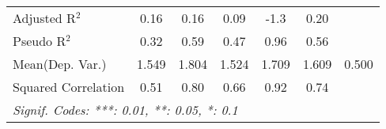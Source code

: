 \begin{tabular}{lcccccc}
   Adjusted R$^2$                                             & 0.16    & 0.16          & 0.09    & -1.3    & 0.20    & \\  
   Pseudo R$^2$                                               & 0.32    & 0.59          & 0.47    & 0.96    & 0.56    & \\  
Mean(Dep. Var.) & 1.549 & 1.804 & 1.524 & 1.709 & 1.609 & 0.500 \\
   Squared Correlation                                        & 0.51    & 0.80          & 0.66    & 0.92    & 0.74    & \\  
   \midrule \midrule
   \multicolumn{7}{l}{\emph{Signif. Codes: ***: 0.01, **: 0.05, *: 0.1}}\\
\end{tabular}
\par\endgroup
